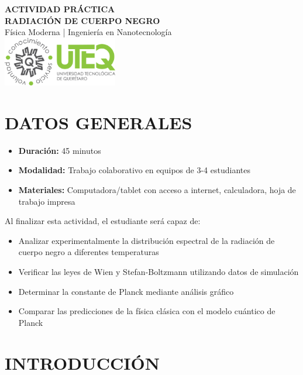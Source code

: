 \documentclass[12pt,a4paper]{article}
\begin{document}
	
	\begin{center}
		{\Huge \textbf{ACTIVIDAD PRÁCTICA}}\\[0.3cm]
		{\LARGE \textbf{RADIACIÓN DE CUERPO NEGRO}}\\[0.2cm]
		{\large Física Moderna | Ingeniería en Nanotecnología}\\[0.5cm]
		\includegraphics[width=5cm]{../../Imagenes/Logo_uteq}
	\end{center}
	
	\vspace{0.5cm}
	
	\section*{DATOS GENERALES}
	\begin{itemize}
		\item \textbf{Duración:} 45 minutos
		\item \textbf{Modalidad:} Trabajo colaborativo en equipos de 3-4 estudiantes
		\item \textbf{Materiales:} Computadora/tablet con acceso a internet, calculadora, hoja de trabajo impresa
	\end{itemize}
	
	\begin{objetivobox}
		Al finalizar esta actividad, el estudiante será capaz de:
		\begin{itemize}
			\item Analizar experimentalmente la distribución espectral de la radiación de cuerpo negro a diferentes temperaturas
			\item Verificar las leyes de Wien y Stefan-Boltzmann utilizando datos de simulación
			\item Determinar la constante de Planck mediante análisis gráfico
			\item Comparar las predicciones de la física clásica con el modelo cuántico de Planck
		\end{itemize}
	\end{objetivobox}
	
	\section*{INTRODUCCIÓN}
	
\end{document}
